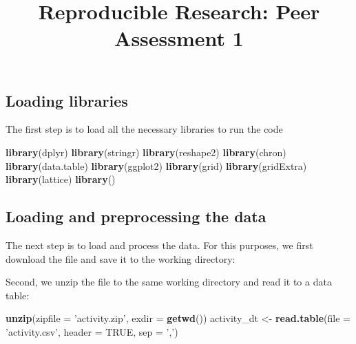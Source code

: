 \documentclass[
]{article}
\title{Reproducible Research: Peer Assessment 1}
\author{}
\date{\vspace{-2.5em}}
\newenvironment{Shaded}{\begin{snugshade}}{\end{snugshade}}
\newcommand{\DataTypeTok}[1]{\textcolor[rgb]{0.13,0.29,0.53}{#1}}
\newcommand{\KeywordTok}[1]{\textcolor[rgb]{0.13,0.29,0.53}{\textbf{#1}}}
\newcommand{\NormalTok}[1]{#1}
\newcommand{\OtherTok}[1]{\textcolor[rgb]{0.56,0.35,0.01}{#1}}
\newcommand{\StringTok}[1]{\textcolor[rgb]{0.31,0.60,0.02}{#1}}
\begin{document}
\maketitle

\hypertarget{loading-libraries}{%
\subsection{Loading libraries}\label{loading-libraries}}

The first step is to load all the necessary libraries to run the code

\begin{Shaded}
\begin{Highlighting}[]
\KeywordTok{library}\NormalTok{(dplyr)}
\KeywordTok{library}\NormalTok{(stringr)}
\KeywordTok{library}\NormalTok{(reshape2)}
\KeywordTok{library}\NormalTok{(chron)}
\KeywordTok{library}\NormalTok{(data.table)}
\KeywordTok{library}\NormalTok{(ggplot2)}
\KeywordTok{library}\NormalTok{(grid)}
\KeywordTok{library}\NormalTok{(gridExtra)}
\KeywordTok{library}\NormalTok{(lattice)}
\KeywordTok{library}\NormalTok{()}
\end{Highlighting}
\end{Shaded}

\hypertarget{loading-and-preprocessing-the-data}{%
\subsection{Loading and preprocessing the
data}\label{loading-and-preprocessing-the-data}}

The next step is to load and process the data. For this purposes, we
first download the file and save it to the working directory:

\begin{Shaded}
\end{Shaded}

Second, we unzip the file to the same working directory and read it to a
data table:

\begin{Shaded}
\begin{Highlighting}[]
\KeywordTok{unzip}\NormalTok{(}\DataTypeTok{zipfile =} \StringTok{'activity.zip'}\NormalTok{, }\DataTypeTok{exdir =} \KeywordTok{getwd}\NormalTok{())}
\NormalTok{activity_dt <-}\StringTok{ }\KeywordTok{read.table}\NormalTok{(}\DataTypeTok{file =} \StringTok{'activity.csv'}\NormalTok{, }\DataTypeTok{header =} \OtherTok{TRUE}\NormalTok{, }\DataTypeTok{sep =} \StringTok{','}\NormalTok{)}
\end{Highlighting}
\end{Shaded}
\end{document}
